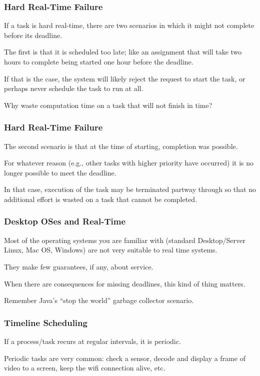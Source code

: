 \begin{frame}
\frametitle{Hard Real-Time Failure}

If a task is hard real-time, there are two scenarios in which it might not complete before its deadline. 

The first is that it is scheduled too late; like an assignment that will take two hours to complete being started one hour before the deadline. 

If that is the case, the system will likely reject the request to start the task, or perhaps never schedule the task to run at all. 

Why waste computation time on a task that will not finish in time? 

\end{frame}

\begin{frame}
\frametitle{Hard Real-Time Failure}

The second scenario is that at the time of starting, completion was possible. 

For whatever reason (e.g., other tasks with higher priority have occurred) it is no longer possible to meet the deadline. 

In that case, execution of the task may be terminated partway through so that no additional effort is wasted on a task that cannot be completed.


\end{frame}

\begin{frame}
\frametitle{Desktop OSes and Real-Time}

Most of the operating systems you are familiar with (standard Desktop/Server Linux, Mac OS, Windows) are not very suitable to real time systems. 

They make few guarantees, if any, about service. 

When there are consequences for missing deadlines, this kind of thing matters. 

Remember Java's ``stop the world'' garbage collector scenario.

\end{frame}

\begin{frame}
\frametitle{Timeline Scheduling}

If a process/task recurs at regular intervals, it is \alert{periodic}.

Periodic tasks are very common: check a sensor, decode and display a frame of video to a screen, keep the wifi connection alive, etc.

\end{frame}

